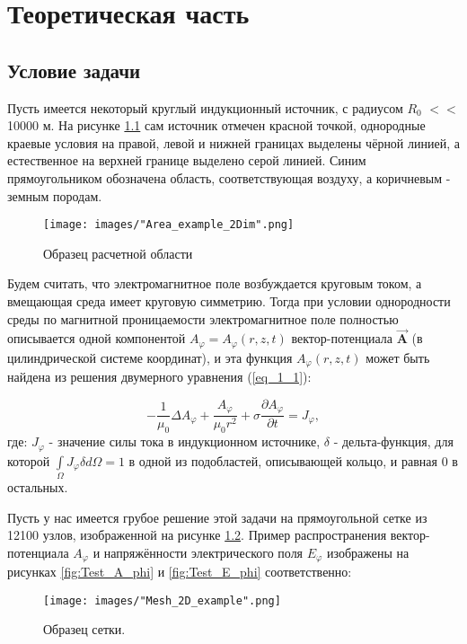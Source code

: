 \chapter{Теоретическая часть}

\section{Условие задачи}

Пусть имеется некоторый круглый индукционный источник, с радиусом $R_0$ $<<$ 10000 м. На рисунке \ref{fig:areaExample} сам источник отмечен красной точкой, однородные краевые условия на правой, левой и нижней границах выделены чёрной линией, а естественное на верхней границе выделено серой линией. Синим прямоугольником обозначена область, соответствующая воздуху, а коричневым - земным породам.

\begin{figure}
	\centering
	\texttt{[image: images/"Area\_example\_2Dim".png]}
	\caption{Образец расчетной области}
	\label{fig:areaExample}
\end{figure}

Будем считать, что электромагнитное поле возбуждается круговым током, а вмещающая среда имеет круговую симметрию. Тогда при условии однородности среды по магнитной проницаемости электромагнитное поле полностью описывается одной компонентой $A_{\varphi} = A_{\varphi}(r, z, t)$ вектор-потенциала $\overrightarrow{\textbf{A}}$ (в цилиндрической системе координат), и эта функция $A_{\varphi}(r, z, t)$ может быть найдена из решения двумерного уравнения (\ref{eq_1_1}):

\begin{equation} \label{eq_1_1}
	-\frac{1}{\mu_0} \Delta A_{\varphi} + \frac{A_{\varphi}}{\mu_0 r^2} + \sigma \frac{\partial A_{\varphi}}{\partial t} = J_{\varphi},
\end{equation}
где: $J_{\varphi}$ - значение силы тока в индукционном источнике, $\delta$ - дельта-функция, для которой $\int \limits_{\Omega} J_{\varphi} \delta d \Omega = 1$ в одной из подобластей, описывающей кольцо, и равная 0 в остальных.

Пусть у нас имеется грубое решение этой задачи на прямоугольной сетке из 12100 узлов, изображенной на рисунке \ref{fig:2d_mesh_example}. Пример распространения вектор-потенциала $A_{\varphi}$ и напряжённости электрического поля $E_{\varphi}$ изображены на рисунках \ref{fig:Test_A_phi} и \ref{fig:Test_E_phi} соответственно:

\begin{figure}
	\centering
	\texttt{[image: images/"Mesh\_2D\_example".png]}
	\caption{Образец сетки.}
	\label{fig:2d_mesh_example}
\end{figure}


